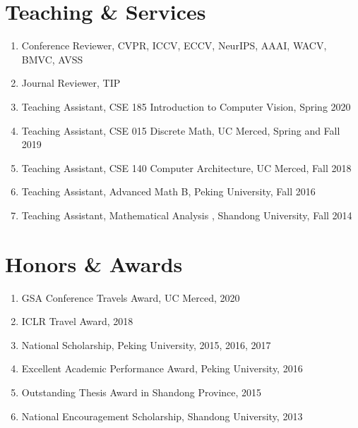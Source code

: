 \documentclass[letterpaper]{article}
\def\footerlink{http://jblevins.org/projects/cv-template/}
\begin{document}
\section*{Teaching \& Services}

\begin{enumerate}

\item Conference Reviewer, CVPR, ICCV, ECCV, NeurIPS, AAAI, WACV, BMVC, AVSS

\item Journal Reviewer, TIP

\item Teaching Assistant, CSE 185 Introduction to Computer Vision, Spring 2020

\item Teaching Assistant, CSE 015 Discrete Math, UC Merced, Spring and Fall 2019

\item Teaching Assistant, CSE 140 Computer Architecture, UC Merced, Fall 2018

\item Teaching Assistant, Advanced Math B, Peking University, Fall 2016

\item Teaching Assistant, Mathematical Analysis \uppercase\expandafter{}, Shandong University, Fall 2014

\end{enumerate}


\section*{Honors \& Awards}

\begin{enumerate}

\item GSA Conference Travels Award, UC Merced, 2020

\item ICLR Travel Award, 2018

\item National Scholarship, Peking University, 2015, 2016, 2017

\item Excellent Academic Performance Award, Peking University, 2016

\item Outstanding Thesis Award in Shandong Province, 2015

\item National Encouragement Scholarship, Shandong University, 2013

\end{enumerate}


\bigskip

\end{document}
